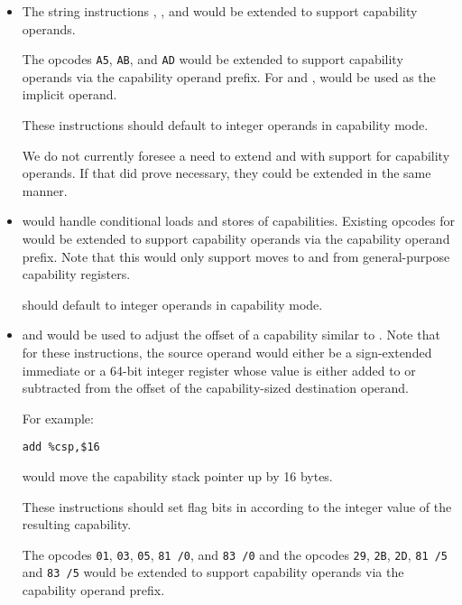 \begin{itemize}
  \item The string instructions , ,
    and  would be extended to support capability
    operands.

    The opcodes \texttt{A5}, \texttt{AB}, and \texttt{AD} would be
    extended to support capability operands via the capability operand
    prefix.  For  and , \CAX{} would
    be used as the implicit operand.

    These instructions should default to integer operands in
    capability mode.

    We do not currently foresee a need to extend  and
     with support for capability operands.  If that
    did prove necessary, they could be extended in the same manner.

  \item {} would handle conditional loads and stores of
    capabilities.  Existing opcodes for  would be
    extended to support capability operands via the capability operand
    prefix.  Note that this would only support moves to and from
    general-purpose capability registers.

     should default to integer operands in
    capability mode.

  \item {} and  would be used to adjust
    the offset of a capability similar to .  Note
    that for these instructions, the source operand would either be a
    sign-extended immediate or a 64-bit integer register whose value
    is either added to or subtracted from the offset of the
    capability-sized destination operand.

    For example:

\begin{verbatim}
add %csp,$16
\end{verbatim}

    would move the capability stack pointer up by 16 bytes.

    These instructions should set flag bits in \RFLAGS{} according to
    the integer value of the resulting capability.

    The  opcodes \texttt{01}, \texttt{03}, \texttt{05},
    \texttt{81 /0}, and \texttt{83 /0} and the 
    opcodes \texttt{29}, \texttt{2B}, \texttt{2D}, \texttt{81 /5} and
    \texttt{83 /5} would be extended to support capability operands
    via the capability operand prefix.


\end{itemize}
